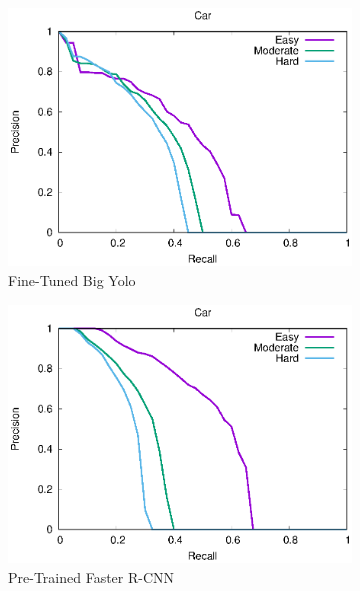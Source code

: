 \begin{figure}[h!]
\begin{subfigure}[t]{.32\textwidth}
    \includegraphics[width=1.0\linewidth]{img/yolo_Dec_7_big/plot_valid_30/car_detection.eps}
    \caption{Fine-Tuned Big Yolo}
\end{subfigure}
\begin{subfigure}[t]{.32\textwidth}
    \centering
    \includegraphics[width=1.0\linewidth]{img/FRCNN_Nov_8/plot_valid_30/car_detection.eps}
    \caption{Pre-Trained Faster R-CNN}
\end{subfigure}%
\begin{subfigure}[t]{.32\textwidth}
    \centering

\end{subfigure}
\end{figure}
